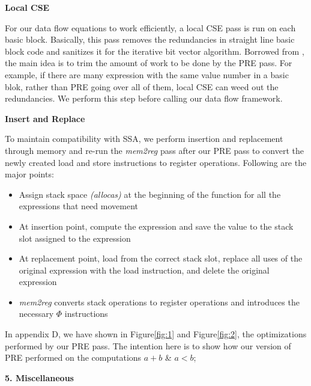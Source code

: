 \documentclass[10pt,twoside]{report}
\begin{document}
\begin{flushleft}
\textbf{\large{Local CSE}}
\end{flushleft}
For our data flow equations to work efficiently, a local CSE pass is run
on each basic block. Basically, this pass removes the redundancies in
straight line basic block code and sanitizes it for the iterative bit vector
algorithm. Borrowed from \cite{Knoop:1994:OCM:183432.183443}, the main idea
is to trim the amount of work to be done by the PRE pass. For example, if there are many
expression with the same value number in a basic blok, rather than PRE going over all of them, 
local CSE can weed out the redundancies. We perform this step before calling
our data flow framework. 

\begin{flushleft}
\textbf{\large{Insert and Replace}}
\end{flushleft}
To maintain compatibility with SSA, we perform insertion and replacement
  through memory and re-run the \emph{mem2reg} pass after our PRE pass to convert the
  newly created load and store instructions to register operations. Following
  are the major points:
\begin{itemize}  
  \item Assign stack space \emph{(allocas)} at the beginning of the
  function for all the expressions that need movement
  \item At insertion point,
           compute the expression and save the value to the stack slot assigned to the
             expression 
  \item At replacement point, load from the correct stack
             slot, replace all uses of the original expression with the load
             instruction, and delete the original expression
  \item \emph{mem2reg} converts stack operations to register operations and introduces the 
             necessary ${\Phi}$ instructions
\end{itemize}  

In appendix D, we have shown in Figure\ref{fig:1}
and Figure\ref{fig:2}, the optimizations performed by our PRE pass. The intention here is to
  show how our version of PRE performed on the computations $a + b$ \& $a < b$;

\begin{flushleft}
\textbf{\Large{5. Miscellaneous}}
\end{flushleft}
\end{document}
